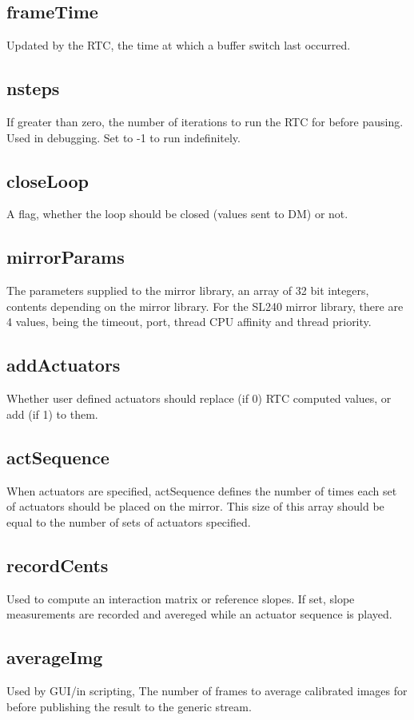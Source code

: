 \documentclass[a4,10pt]{article}
\begin{document}
\subsection{frameTime}
Updated by the RTC, the time at which a buffer switch last occurred.

\subsection{nsteps}
If greater than zero, the number of iterations to run the RTC for
before pausing.  Used in debugging.  Set to -1 to run indefinitely.

\subsection{closeLoop}
A flag, whether the loop should be closed (values sent to DM) or not.

\subsection{mirrorParams}
The parameters supplied to the mirror library, an array of 32 bit
integers, contents depending on the mirror library.  For the SL240
mirror library, there are 4 values, being the timeout, port, thread
CPU affinity and thread priority.

\subsection{addActuators}
Whether user defined actuators should replace (if 0) RTC computed
values, or add (if 1) to them.

\subsection{actSequence}
When actuators are specified, actSequence defines the number of times
each set of actuators should be placed on the mirror.  This size of
this array should be equal to the number of sets of actuators
specified.

\subsection{recordCents}
Used to compute an interaction matrix or reference slopes.  If set,
slope measurements are recorded and avereged while an actuator
sequence is played.


\subsection{averageImg}
Used by GUI/in scripting, The number of frames to average calibrated
images for before publishing the result to the generic stream.
\end{document}
